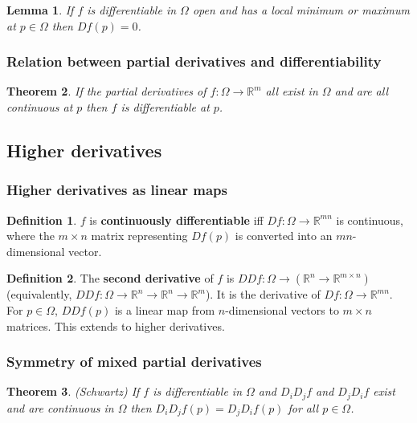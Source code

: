 \documentclass[12pt]{article}
\newtheorem{thm}{Theorem}[section]
\newtheorem{lem}[thm]{Lemma}
\theoremstyle{definition}
\newtheorem{defn}{Definition}[section]
\newcommand{\R}{\mathbb{R}}
\begin{document}
\begin{lem}
  If $f$ is differentiable in $\Omega$ open and has a local minimum or maximum at $p \in \Omega$ then $Df(p) = 0$.
\end{lem}

\subsubsection{Relation between partial derivatives and differentiability}

\begin{thm}
  If the partial derivatives of $f : \Omega \to \R^m$ all exist in $\Omega$ and are all continuous at $p$ then $f$ is differentiable at $p$.
\end{thm}

\subsection{Higher derivatives}

\subsubsection{Higher derivatives as linear maps}

\begin{defn}
  $f$ is \textbf{continuously differentiable} iff $Df : \Omega \to \R^{mn}$ is continuous, where the $m \times n$ matrix representing $Df(p)$ is converted into an $mn$-dimensional vector.
\end{defn}

\begin{defn}
  The \textbf{second derivative} of $f$ is $DDf : \Omega \to (\R^n \to \R^{m \times n})$ (equivalently, $DDf : \Omega \to \R^n \to \R^n \to \R^m$).
  It is the derivative of $Df : \Omega \to \R^{mn}$.
  For $p \in \Omega$, $DDf(p)$ is a linear map from $n$-dimensional vectors to $m \times n$ matrices.
  This extends to higher derivatives.
\end{defn}

\subsubsection{Symmetry of mixed partial derivatives}

\begin{thm}
  (Schwartz)
  If $f$ is differentiable in $\Omega$ and $D_iD_jf$ and $D_jD_if$ exist and are continuous in $\Omega$ then $D_iD_jf(p) = D_jD_if(p)$ for all $p \in \Omega$.
\end{thm}
\end{document}
